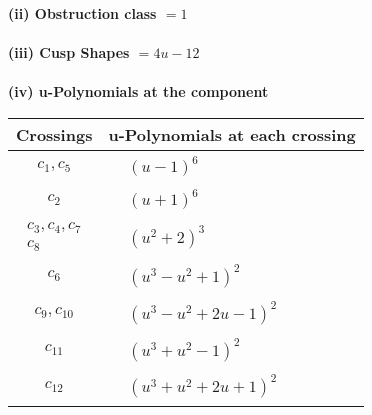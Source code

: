 \documentclass[1p]{elsarticle_modified}
\theoremstyle{definition}
\begin{document}
\flushleft \textbf{(ii) Obstruction class $= 1$}\\~\\
\flushleft \textbf{(iii) Cusp Shapes $= 4 u-12$}\\~\\
\newpage\renewcommand{\arraystretch}{1}
\flushleft \textbf{(iv) u-Polynomials at the component}\newline \\
\begin{tabular}{m{50pt}|m{274pt}}
Crossings & \hspace{64pt}u-Polynomials at each crossing \\
\hline $$\begin{aligned}c_{1},c_{5}\end{aligned}$$&$\begin{aligned}
&(u-1)^6
\end{aligned}$\\
\hline $$\begin{aligned}c_{2}\end{aligned}$$&$\begin{aligned}
&(u+1)^6
\end{aligned}$\\
\hline $$\begin{aligned}c_{3},c_{4},c_{7}\\c_{8}\end{aligned}$$&$\begin{aligned}
&(u^2+2)^3
\end{aligned}$\\
\hline $$\begin{aligned}c_{6}\end{aligned}$$&$\begin{aligned}
&(u^3- u^2+1)^2
\end{aligned}$\\
\hline $$\begin{aligned}c_{9},c_{10}\end{aligned}$$&$\begin{aligned}
&(u^3- u^2+2 u-1)^2
\end{aligned}$\\
\hline $$\begin{aligned}c_{11}\end{aligned}$$&$\begin{aligned}
&(u^3+u^2-1)^2
\end{aligned}$\\
\hline $$\begin{aligned}c_{12}\end{aligned}$$&$\begin{aligned}
&(u^3+u^2+2 u+1)^2
\end{aligned}$\\
\hline
\end{tabular}\\~\\
\end{document}
